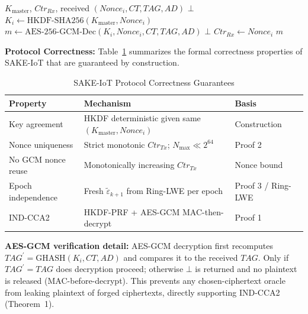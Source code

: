 \documentclass[conference]{IEEEtran}
\newcommand{\Kmaster}{K_{\mathrm{master}}}
\newcommand{\Nmax}{N_{\max}}
\begin{document}
\begin{algorithm}[!t]
\caption{SAKE-Tier2-Receiver}
\label{alg:receiver}
\begin{algorithmic}[1]
\Require $\Kmaster$, $\mathit{Ctr}_{Rx}$, received $(\mathit{Nonce}_i, CT, TAG, AD)$
 
    \State \Return $\bot$ 
\EndIf
\State $K_i \leftarrow \mathrm{HKDF\text{-}SHA256}(\Kmaster, \mathit{Nonce}_i)$
\State $m \leftarrow \mathrm{AES\text{-}256\text{-}GCM\text{-}Dec}(K_i, \mathit{Nonce}_i, CT, TAG, AD)$
    \State \Return $\bot$ 
\EndIf
\State $\mathit{Ctr}_{Rx} \leftarrow \mathit{Nonce}_i$ 
\State \Return $m$
\end{algorithmic}
\end{algorithm}

\noindent\textbf{Protocol Correctness:} Table~\ref{tab:correctness}
summarizes the formal correctness properties of SAKE-IoT that are guaranteed
by construction.

\begin{table}[!t]
\centering
\small
\caption{SAKE-IoT Protocol Correctness Guarantees}
\label{tab:correctness}
\renewcommand{\arraystretch}{1.1}
\begin{tabular}{p{2.0cm}p{3.5cm}p{1.5cm}}
\toprule
\textbf{Property} & \textbf{Mechanism} & \textbf{Basis} \\
\midrule
Key agreement & HKDF deterministic given same $(\Kmaster, \mathit{Nonce}_i)$ & Construction \\
Nonce uniqueness & Strict monotonic $\mathit{Ctr}_{Tx}$; $\Nmax \ll 2^{64}$ & Proof 2 \\
No GCM nonce reuse & Monotonically increasing $\mathit{Ctr}_{Tx}$ & Nonce bound \\
Epoch independence & Fresh $\tilde{\varepsilon}_{k+1}$ from Ring-LWE per epoch & Proof 3 / Ring-LWE \\
IND-CCA2 & HKDF-PRF + AES-GCM MAC-then-decrypt & Proof 1 \\
\bottomrule
\end{tabular}
\end{table}

\noindent\textbf{AES-GCM verification detail:} AES-GCM decryption first
recomputes $TAG^{\prime} = \mathrm{GHASH}(K_i, CT, AD)$ and compares it to the
received $TAG$. Only if $TAG^{\prime} = TAG$ does decryption proceed; otherwise
$\bot$ is returned and no plaintext is released (MAC-before-decrypt).
This prevents any chosen-ciphertext oracle from leaking plaintext of forged
ciphertexts, directly supporting IND-CCA2 (Theorem~1).
\end{document}
